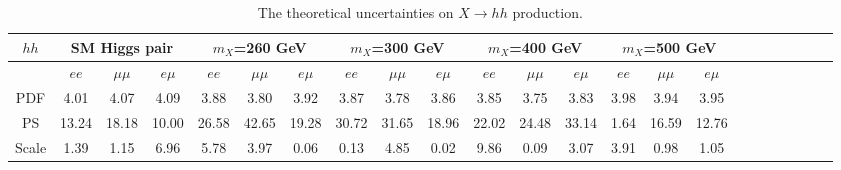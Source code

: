 \begin{table}[!htp]
\tiny
\centering
 \begin{tabular}{c|cccccccccccccccccccccc}
\hline
 $hh$ &\multicolumn{3}{c}{SM Higgs pair} &\multicolumn{3}{c}{$m_X$=260 GeV} &\multicolumn{3}{c}{$m_X$=300 GeV} &\multicolumn{3}{c}{$m_X$=400 GeV}  &\multicolumn{3}{c}{$m_X$=500 GeV} \\
\hline
     &$ee$  &$\mu\mu$  &$e\mu$  &$ee$  &$\mu\mu$  &$e\mu$  &$ee$  &$\mu\mu$  &$e\mu$ &$ee$  &$\mu\mu$  &$e\mu$ &$ee$  &$\mu\mu$  &$e\mu$ \\
PDF &4.01 &4.07 &4.09
    &3.88 &3.80 &3.92 
    &3.87 &3.78 &3.86 
    &3.85 &3.75 &3.83 
    &3.98 &3.94 &3.95 \\ 
PS  &13.24&18.18&10.00
    &26.58&42.65&19.28
    &30.72&31.65&18.96
    &22.02&24.48&33.14
    &1.64&16.59&12.76
\\
Scale &1.39 &1.15 &6.96
      &5.78 &3.97 &0.06
      &0.13 &4.85 &0.02
      &9.86 &0.09 &3.07
      &3.91 &0.98 &1.05 \\
\hline
\end{tabular}
\caption{The theoretical uncertainties on $X\rightarrow hh$ production.}
\label{tab:sig_theory_hh}
\end{table}
